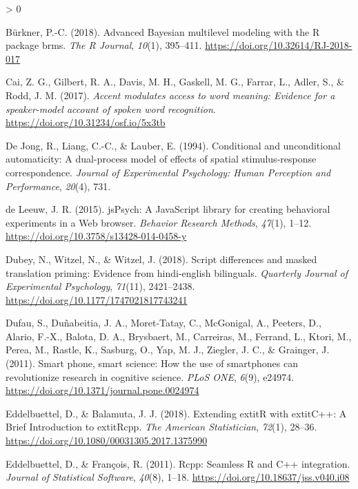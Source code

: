 \documentclass[
  english,
  man,floatsintext]{apa6}
\newlength{\cslhangindent}
\newenvironment{CSLReferences}[2] %
 {%
  \setlength{\parindent}{0pt}
  \ifodd #1 \everypar{\setlength{\hangindent}{\cslhangindent}}\ignorespaces\fi
  \ifnum #2 > 0
  \setlength{\parskip}{#2\baselineskip}
  \fi
 }%
 {}
\begin{document}
\begin{CSLReferences}{1}{0}
\leavevmode\hypertarget{ref-R-brms_b}{}%
Bürkner, P.-C. (2018). Advanced {Bayesian} multilevel modeling with the {R} package {brms}. \emph{The R Journal}, \emph{10}(1), 395--411. \url{https://doi.org/10.32614/RJ-2018-017}

\leavevmode\hypertarget{ref-cai2017accent}{}%
Cai, Z. G., Gilbert, R. A., Davis, M. H., Gaskell, M. G., Farrar, L., Adler, S., \& Rodd, J. M. (2017). \emph{Accent modulates access to word meaning: Evidence for a speaker-model account of spoken word recognition}. \url{https://doi.org/10.31234/osf.io/5x3tb}

\leavevmode\hypertarget{ref-de1994conditional}{}%
De Jong, R., Liang, C.-C., \& Lauber, E. (1994). Conditional and unconditional automaticity: A dual-process model of effects of spatial stimulus-response correspondence. \emph{Journal of Experimental Psychology: Human Perception and Performance}, \emph{20}(4), 731.

\leavevmode\hypertarget{ref-deleeuw2015}{}%
de Leeuw, J. R. (2015). jsPsych: A JavaScript library for creating behavioral experiments in a Web browser. \emph{Behavior Research Methods}, \emph{47}(1), 1--12. \url{https://doi.org/10.3758/s13428-014-0458-y}

\leavevmode\hypertarget{ref-Dubey_2018}{}%
Dubey, N., Witzel, N., \& Witzel, J. (2018). Script differences and masked translation priming: Evidence from hindi-english bilinguals. \emph{Quarterly Journal of Experimental Psychology}, \emph{71}(11), 2421--2438. \url{https://doi.org/10.1177/1747021817743241}

\leavevmode\hypertarget{ref-Dufau_2011}{}%
Dufau, S., Duñabeitia, J. A., Moret-Tatay, C., McGonigal, A., Peeters, D., Alario, F.-X., Balota, D. A., Brysbaert, M., Carreiras, M., Ferrand, L., Ktori, M., Perea, M., Rastle, K., Sasburg, O., Yap, M. J., Ziegler, J. C., \& Grainger, J. (2011). Smart phone, smart science: How the use of smartphones can revolutionize research in cognitive science. \emph{{PLoS} {ONE}}, \emph{6}(9), e24974. \url{https://doi.org/10.1371/journal.pone.0024974}

\leavevmode\hypertarget{ref-R-Rcpp_b}{}%
Eddelbuettel, D., \& Balamuta, J. J. (2018). {Extending extit{R} with extit{C++}: A Brief Introduction to extit{Rcpp}}. \emph{The American Statistician}, \emph{72}(1), 28--36. \url{https://doi.org/10.1080/00031305.2017.1375990}

\leavevmode\hypertarget{ref-R-Rcpp_a}{}%
Eddelbuettel, D., \& François, R. (2011). {Rcpp}: Seamless {R} and {C++} integration. \emph{Journal of Statistical Software}, \emph{40}(8), 1--18. \url{https://doi.org/10.18637/jss.v040.i08}


\end{CSLReferences}
\end{document}
